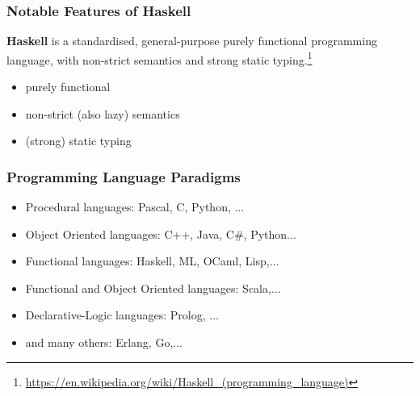 \documentclass[pdftex,landscape,final,handout,british]{beamer}
\begin{document}
    \begin{frame}
    \frametitle{Notable Features of Haskell}

    {\bf Haskell}  is a standardised, general-purpose purely functional
    programming language, with non-strict semantics and strong static
    typing.\footnote{\url{https://en.wikipedia.org/wiki/Haskell_(programming_language)}}


    \begin{itemize}
    \item<2-> purely functional
    
    \item<3-> non-strict (also lazy) semantics

    \item<4-> (strong) static typing
    
    \end{itemize}

    \end{frame}


    \begin{frame}
    \frametitle{Programming Language Paradigms}
    
    \begin{itemize}
    \item<1-> Procedural languages: Pascal, C, Python, ...
    \item<2-> Object Oriented languages: C++, Java, C\#, Python... 
    \item<3-> Functional languages: Haskell, ML, OCaml, Lisp,...
    \item<4-> Functional and Object Oriented languages: Scala,...  
    \item<5-> Declarative-Logic languages: Prolog, ...
    \item<6-> and many others: Erlang, Go,...
    \end{itemize}

    \end{frame}


\end{document}

